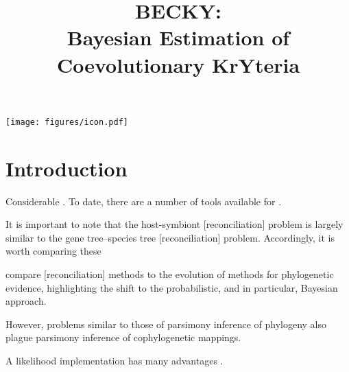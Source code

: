 \documentclass[12pt,letterpaper]{article}
\title{BECKY:\\Bayesian Estimation of Coevolutionary KrYteria}
\begin{document}
\begin{acronym}
\end{acronym}

\begin{titlepage}
\null
\vfil
\let\newpage\relax\maketitle
\vfil
\centering
\texttt{[image: figures/icon.pdf]}
\vfil
\end{titlepage}

\newpage

\doublespacing

\section*{Introduction}

Considerable . To date, there are a number of tools available for .

It is important to note that the host-symbiont [reconciliation] problem is largely similar to the gene tree--species tree [reconciliation] problem. Accordingly, it is worth comparing these 

\textcite{Akerborg:2009} compare [reconciliation] methods to the evolution of methods for phylogenetic evidence, highlighting the shift to the probabilistic, and in particular, Bayesian approach.

However, problems similar to those of parsimony inference of phylogeny also plague parsimony inference of cophylogenetic mappings.

A likelihood implementation has many advantages \parencite{Charleston:2009}.
\end{document}
